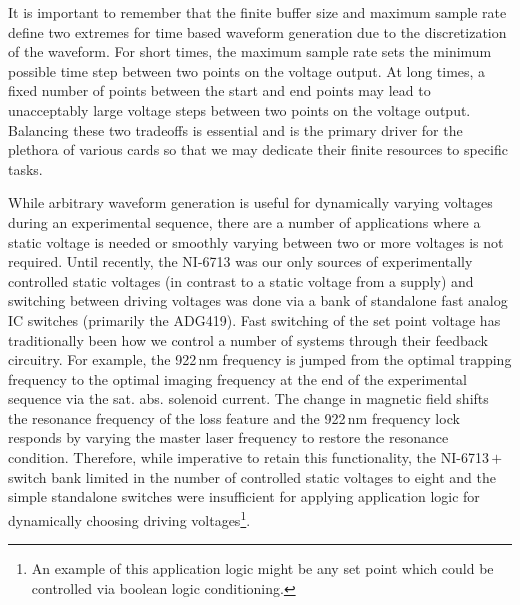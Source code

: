 It is important to remember that the finite buffer size and maximum sample rate define two extremes for time based waveform generation due to the discretization of the waveform.
For short times, the maximum sample rate sets the minimum possible time step between two points on the voltage output.
At long times, a fixed number of points between the start and end points may lead to unacceptably large voltage steps between two points on the voltage output.
Balancing these two tradeoffs is essential and is the primary driver for the plethora of various cards so that we may dedicate their finite resources to specific tasks.

While arbitrary waveform generation is useful for dynamically varying voltages during an experimental sequence, there are a number of applications where a static voltage is needed or smoothly varying between two or more voltages is not required.
Until recently, the NI-6713 was our only sources of experimentally controlled static voltages (in contrast to a static voltage from a supply) and switching between driving voltages was done via a bank of standalone fast analog IC switches (primarily the ADG419).
Fast switching of the set point voltage has traditionally been how we control a number of systems through their feedback circuitry.
For example, the 922\,nm frequency is jumped from the optimal trapping frequency to the optimal imaging frequency at the end of the experimental sequence via the sat. abs. solenoid current.
The change in magnetic field shifts the resonance frequency of the loss feature and the 922\,nm frequency lock responds by varying the master laser frequency to restore the resonance condition.
Therefore, while imperative to retain this functionality, the NI-6713\,$+$\,switch bank limited in the number of controlled static voltages to eight and the simple standalone switches were insufficient for applying application logic for dynamically choosing driving voltages\footnote{An example of this application logic might be any set point which could be controlled via boolean logic conditioning.}.


